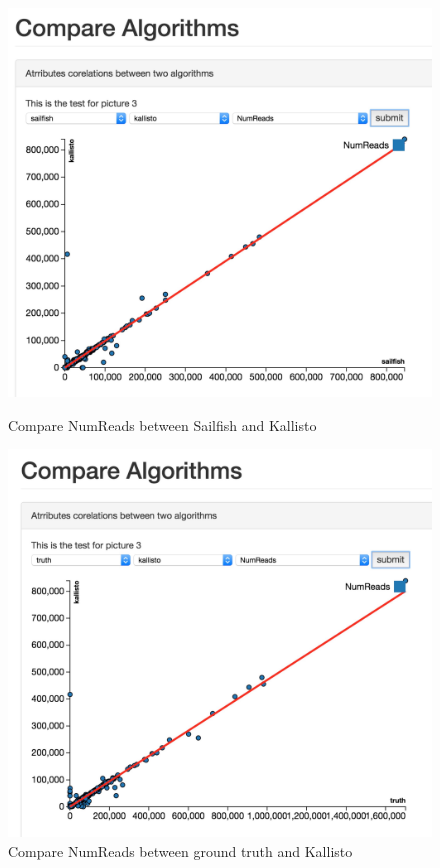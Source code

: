 \documentclass[11pt,letter]{article}
\begin{document}
\begin{figure}[ht]
\centering
\begin{minipage}[b]{0.47\linewidth}
\includegraphics[width=1.0\textwidth]{./fig/compare_sk.jpg}
\caption{Compare NumReads between Sailfish and Kallisto }
\label{fig:compare_sk}
\end{minipage}
\quad
\begin{minipage}[b]{0.47\linewidth}
\includegraphics[width=1.0\textwidth]{./fig/compare_truth.jpg}
\caption{Compare NumReads between ground truth and Kallisto  }
\label{fig:compare_truth}
\end{minipage}
\end{figure}
\end{document}
